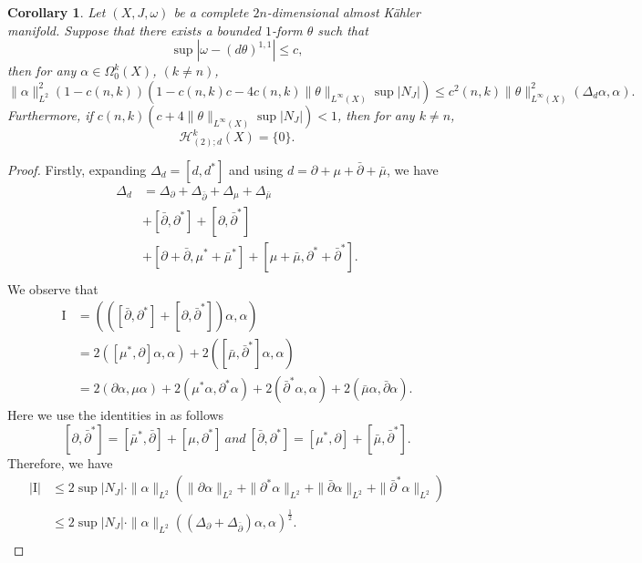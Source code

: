 \documentclass[12pt, twoside]{article}
\newtheorem{corollary}[theorem]{Corollary}
\theoremstyle{definition}
\numberwithin{equation}{section}
\def \a {\alpha }
\def \De {\Delta}
\def\w {\omega}
\def\Om{\Omega}
\def\pa{\partial}
\begin{document}
	\begin{corollary}\label{C2}
		Let $(X,J,\w)$ be a complete $2n$-dimensional almost K\"{a}hler manifold. Suppose that there exists a bounded $1$-form $\theta$ such that
		$$\sup|\w-(d\theta)^{1,1}|\leq c,$$
		then for any $\a\in\Om^{k}_{0}(X)$, $(k\neq n)$,
		\begin{equation}\label{E25}
		\|\a\|_{L^2}^{2}(1-c(n,k))(1-c(n,k)c-4c(n,k)\|\theta\|_{L^{\infty}(X)}\sup|N_{J}|)\leq c^{2}(n,k)\|\theta\|^{2}_{L^{\infty}(X)}(\De_{d}\a,\a).
		\end{equation} 
		Furthermore, if $c(n,k)(c+4\|\theta\|_{L^{\infty}(X)}\sup|N_{J}|)<1$, then for any $k\neq n$,
		$$\mathcal{H}^{k}_{(2);d}(X)=\{0\}.$$
	\end{corollary}
	\begin{proof}
		Firstly, expanding $\De_{d}=[d,d^{\ast}]$ and using $d=\pa+\mu+\bar{\pa}+\bar{\mu}$, we have
		\begin{equation*}
		\begin{split}
		\De_{d}&=\De_{\pa}+\De_{\bar{\pa}}+\De_{\mu}+\De_{\bar{\mu}}\\
		&+[\bar{\pa},\pa^{\ast}]+[\pa,\bar{\pa}^{\ast}]\\
		&+[\pa+\bar{\pa},\mu^{\ast}+\bar{\mu}^{\ast}]+[\mu+\bar{\mu},\pa^{\ast}+\bar{\pa}^{\ast}].\\
		\end{split}
		\end{equation*}
		We observe that
		\begin{equation*}
		\begin{split}
		\mathrm{I}&=(([\bar{\pa},\pa^{\ast}]+[\pa,\bar{\pa}^{\ast}])\a,\a)\\
		&=2([\mu^{\ast},\pa]\a,\a)+2([\bar{\mu},\bar{\pa}^{\ast}]\a,\a)\\
		&=2(\pa\a,\mu\a)+2(\mu^{\ast}\a,\pa^{\ast}\a)+2(\bar{\pa}^{\ast}\a,\a)+2(\bar{\mu}\a,\bar{\pa}\a).
		\end{split}
		\end{equation*}
		Here we use the identities in \cite[Proposition 3.3]{CW20} as follows
		$$[\pa,\bar{\pa}^{\ast}]=[\bar{\mu}^{\ast},\bar{\pa}]+[\mu,\pa^{\ast}]\ and\ [\bar{\pa},\pa^{\ast}]=[\mu^{\ast},\pa]+[\bar{\mu},\bar{\pa}^{\ast}].$$
		Therefore, we have
		\begin{equation*}
		\begin{split}
		|\mathrm{I}|&\leq 2\sup|N_{J}|\cdot\|\a\|_{L^2}(\|\pa\a\|_{L^2}+\|\pa^{\ast}\a\|_{L^2}+\|\bar{\pa}\a\|_{L^2}+\|\bar{\pa}^{\ast}\a\|_{L^2})\\
		&\leq 2\sup|N_{J}|\cdot\|\a\|_{L^2}((\De_{\pa}+\De_{\bar{\pa}})\a,\a)^{\frac{1}{2}}.\\

\end{split}
\end{equation*}
\end{proof}
\end{document}
